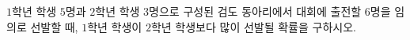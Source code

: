 $1$학년 학생 $5$명과 $2$학년 학생 $3$명으로 구성된 검도 동아리에서 대회에 출전할 $6$명을 임의로 선발할 때, $1$학년 학생이 $2$학년 학생보다 많이 선발될 확률을 구하시오.
